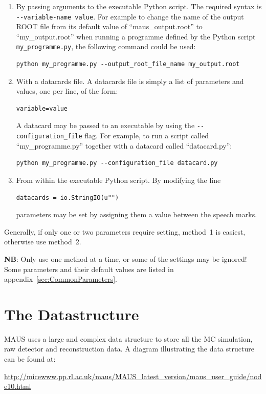 \documentclass[a4paper,10pt]{article}
\begin{document}
    \begin{enumerate}
     \item By passing arguments to the executable Python script.  The required syntax is \texttt{-{}-variable-name value}. For example to change the name of the output ROOT file from its default value of ``maus\_output.root'' to ``my\_output.root'' when running a programme defined by the Python script \texttt{my\_programme.py}, the following command could be used:
     \begin{lstlisting}
python my_programme.py --output_root_file_name my_output.root
    \end{lstlisting}
    \item With a datacards file. A datacards file is simply a list of parameters and values, one per line, of the form:
    \begin{lstlisting}
variable=value
    \end{lstlisting}
    A datacard may be passed to an executable by using the \texttt{-{}-configuration\_file} flag. For example, to run a script called ``my\_programme.py'' together with a datacard called ``datacard.py'':
    \begin{lstlisting}
python my_programme.py --configuration_file datacard.py
    \end{lstlisting}
    \item From within the executable Python script. By modifying the line
    \begin{lstlisting}
datacards = io.StringIO(u"")
    \end{lstlisting}
    parameters may be set by assigning them a value between the speech marks.
    \end{enumerate}
    Generally, if only one or two parameters require setting, method~1 is easiest, otherwise use method~2. 

    \textbf{NB}: Only use one method at a time, or some of the settings may be ignored! Some parameters and their default values are listed in appendix~\ref{sec:CommonParameters}.

\section{The Datastructure}
\label{sec:Datastructure}

MAUS uses a large and complex data structure to store all the MC simulation, raw detector and reconstruction data.  A diagram illustrating the data structure can be found at:

\url{http://micewww.pp.rl.ac.uk/maus/MAUS_latest_version/maus_user_guide/node10.html}
\end{document}
